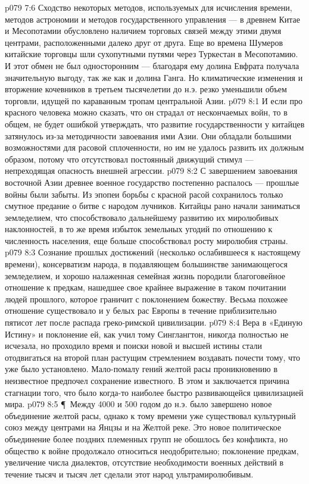 \vs p079 7:6 Сходство некоторых методов, используемых для исчисления времени, методов астрономии и методов государственного управления --- в древнем Китае и Месопотамии обусловлено наличием торговых связей между этими двумя центрами, расположенными далеко друг от друга. Еще во времена Шумеров китайские торговцы шли сухопутными путями через Туркестан в Месопотамию. И этот обмен не был односторонним --- благодаря ему долина Евфрата получала значительную выгоду, так же как и долина Ганга. Но климатические изменения и вторжение кочевников в третьем тысячелетии до н.э. резко уменьшили объем торговли, идущей по караванным тропам центральной Азии.
\vs p079 8:1 И если про красного человека можно сказать, что он страдал от нескончаемых войн, то в общем, не будет ошибкой утверждать, что развитие государственности у китайцев затянулось из\hyp{}за методичности завоевания ими Азии. Они обладали большими возможностями для расовой сплоченности, но им не удалось развить их должным образом, потому что отсутствовал постоянный движущий стимул --- непреходящая опасность внешней агрессии.
\vs p079 8:2 С завершением завоевания восточной Азии древнее военное государство постепенно распалось --- прошлые войны были забыты. Из эпопеи борьбы с красной расой сохранилось только смутное предание о битве с народом лучников. Китайцы рано начали заниматься земледелием, что способствовало дальнейшему развитию их миролюбивых наклонностей, в то же время избыток земельных угодий по отношению к численность населения, еще больше способствовал росту миролюбия страны.
\vs p079 8:3 Сознание прошлых достижений (несколько ослабившееся к настоящему времени), консерватизм народа, в подавляющем большинстве занимающегося земледелием, и хорошо налаженная семейная жизнь породили благоговейное отношение к предкам, нашедшее свое крайнее выражение в таком почитании людей прошлого, которое граничит с поклонением божеству. Весьма похожее отношение существовало и у белых рас Европы в течение приблизительно пятисот лет после распада греко\hyp{}римской цивилизации.
\vs p079 8:4 Вера в «Единую Истину» и поклонение ей, как учил тому Синглангтон, никогда полностью не исчезала, но проходило время и поиски новой и высшей истины стали отодвигаться на второй план растущим стремлением воздавать почести тому, что уже было установлено. Мало\hyp{}помалу гений желтой расы проникновению в неизвестное предпочел сохранение известного. В этом и заключается причина стагнации того, что было когда\hyp{}то наиболее быстро развивающейся цивилизацией мира.
\vs p079 8:5 \P\ Между 4000 и 500 годом до н.э. было завершено новое объединение желтой расы, однако к тому времени уже существовал культурный союз между центрами на Янцзы и на Желтой реке. Это новое политическое объединение более поздних племенных групп не обошлось без конфликта, но общество к войне продолжало относиться неодобрительно; поклонение предкам, увеличение числа диалектов, отсутствие необходимости военных действий в течение тысяч и тысяч лет сделали этот народ ультрамиролюбивым.

